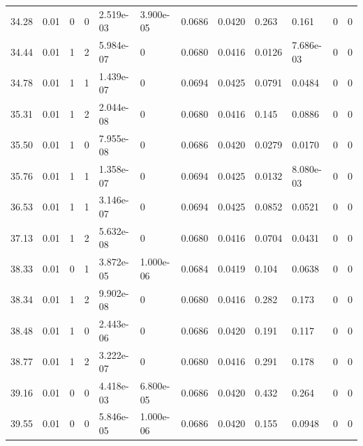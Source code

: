 \documentclass[preview]{standalone}
\begin{document}
{{{\begin{tabular}{L{1.2cm}C{1.2cm} C{0.3cm}C{0.5cm} C{1.4cm}C{1.4cm} C{1.4cm}C{1.4cm} C{1.6cm}C{1.6cm} C{1.6cm}C{1.6cm}}
  34.28  &  0.01  & 0     &  0 &  2.519e-03  & 3.900e-05  &  0.0686&   0.0420& 0.263 & 0.161   &  0 & 0  \\ 
  34.44  &  0.01  & 1     &  2 &  5.984e-07  & 0  &  0.0680&   0.0416& 0.0126 & 7.686e-03   &  0 & 0  \\ 
  34.78  &  0.01  & 1     &  1 &  1.439e-07  & 0  &  0.0694&   0.0425& 0.0791 & 0.0484   &  0 & 0  \\ 
  35.31  &  0.01  & 1     &  2 &  2.044e-08  & 0  &  0.0680&   0.0416& 0.145 & 0.0886   &  0 & 0  \\ 
  35.50  &  0.01  & 1     &  0 &  7.955e-08  & 0  &  0.0686&   0.0420& 0.0279 & 0.0170   &  0 & 0  \\ 
  35.76  &  0.01  & 1     &  1 &  1.358e-07  & 0  &  0.0694&   0.0425& 0.0132 & 8.080e-03   &  0 & 0  \\ 
  36.53  &  0.01  & 1     &  1 &  3.146e-07  & 0  &  0.0694&   0.0425& 0.0852 & 0.0521   &  0 & 0  \\ 
  37.13  &  0.01  & 1     &  2 &  5.632e-08  & 0  &  0.0680&   0.0416& 0.0704 & 0.0431   &  0 & 0  \\ 
  38.33  &  0.01  & 0     &  1 &  3.872e-05  & 1.000e-06  &  0.0684&   0.0419& 0.104 & 0.0638   &  0 & 0  \\ 
  38.34  &  0.01  & 1     &  2 &  9.902e-08  & 0  &  0.0680&   0.0416& 0.282 & 0.173   &  0 & 0  \\ 
  38.48  &  0.01  & 1     &  0 &  2.443e-06  & 0  &  0.0686&   0.0420& 0.191 & 0.117   &  0 & 0  \\ 
  38.77  &  0.01  & 1     &  2 &  3.222e-07  & 0  &  0.0680&   0.0416& 0.291 & 0.178   &  0 & 0  \\ 
  39.16  &  0.01  & 0     &  0 &  4.418e-03  & 6.800e-05  &  0.0686&   0.0420& 0.432 & 0.264   &  0 & 0  \\ 
  39.55  &  0.01  & 0     &  0 &  5.846e-05  & 1.000e-06  &  0.0686&   0.0420& 0.155 & 0.0948   &  0 & 0  \\ 
\hline 
\end{tabular} 

}}}
\end{document}
